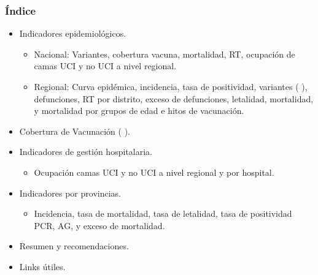 \documentclass[xcolor=table]{beamer}
\begin{document}
	\setcounter{subsection}{1}
	\begin{frame}[label=indice]
		\frametitle{Índice}
		\vspace{-.5cm}
		\begin{itemize}
			\item Indicadores epidemiológicos.
			\begin{itemize}
				\item Nacional: Variantes, cobertura vacuna, mortalidad, RT, ocupación de camas UCI y no UCI a nivel regional. \hyperlink{epi_nacional}{}
				\item Regional: Curva epidémica, incidencia, tasa de positividad, variantes ( \hyperlink{variantes}{}), defunciones, RT por distrito, exceso de defunciones, letalidad, mortalidad, y mortalidad por grupos de edad e hitos de vacunación.  \hyperlink{epi_cusco}{} 
			\end{itemize} 
			\item Cobertura de Vacunación ( \hyperlink{cobertura_vacuna}{}). 
			\item Indicadores de gestión hospitalaria.
			\begin{itemize}
				\item Ocupación camas UCI y no UCI a nivel regional y por hospital. \hyperlink{camas}{} 
			\end{itemize}
			\item Indicadores por provincias.
			\begin{itemize}
				\item Incidencia, tasa de mortalidad, tasa de letalidad, tasa de positividad PCR, AG, y exceso de mortalidad. \hyperlink{provincias}{}
			\end{itemize}
			\item Resumen y recomendaciones. \hyperlink{resumen}{} \hyperlink{recomendaciones}{}
			\item Links útiles. \hyperlink{links}{} \hfill \hyperlink{vacunas_60}{}
		\end{itemize}
	\end{frame}
	
\end{document}
